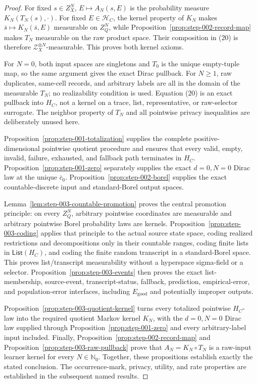 \begin{proof}
For fixed \(s\in Z_X^N\), \(E\mapsto A_N(s,E)\) is the
probability measure \(K_N(T_N(s),\cdot)\). For fixed
\(E\in\mathcal H_C\), the kernel property of \(K_N\) makes
\(\bar s\mapsto K_N(\bar s,E)\) measurable on \(Z_Q^N\), while Proposition~\ref{prop:step-002-record-map} makes \(T_N\) measurable on the
raw product space. Their composition in (20) is therefore
\(\mathcal Z_X^{\otimes N}\)-measurable. This proves both kernel axioms.

For \(N=0\), both input spaces are singletons and \(T_0\) is the unique
empty-tuple map, so the same argument gives the exact Dirac pullback. For
\(N\ge1\), raw duplicates, same-cell records, and arbitrary labels are all
in the domain of the measurable \(T_N\); no realizability condition is used.
Equation (20) is an exact pullback into \(H_C\), not a kernel on a trace,
list, representative, or raw-selector surrogate. The  neighbor
property of \(T_N\) and all pointwise privacy inequalities are deliberately
unused here.

Proposition~\ref{prop:step-001-totalization} supplies the complete
positive-dimensional pointwise quotient procedure and ensures that every
valid, empty, invalid, failure, exhausted, and fallback path terminates in
\(H_C\). Proposition~\ref{prop:step-001-zero} separately supplies
the exact \(d=0,N=0\) Dirac law at the unique \(\bar c_0\). Proposition~\ref{prop:step-002-borel} supplies the exact countable-discrete
input and standard-Borel output spaces.

Lemma~\ref{lem:step-003-countable-promotion} proves the central promotion
principle: on every \(Z_Q^N\), arbitrary pointwise coordinates are
measurable and arbitrary pointwise Borel probability laws are kernels.
Proposition~\ref{prop:step-003-coding} applies that principle to the actual
source state space, coding realized restrictions and decompositions only in
their countable ranges, coding finite lists in
\(\mathsf{List}(H_C)\), and coding the finite random transcript in a
standard-Borel space. This proves list/transcript measurability without a
hyperspace sigma-field or a selector.
Proposition~\ref{prop:step-003-events} then proves the exact list-membership,
source-event, transcript-status, fallback, prediction, empirical-error, and
population-error interfaces, including \(E_{\mathrm{good}}\) and
potentially improper outputs.

Proposition~\ref{prop:step-003-quotient-kernel} turns every totalized
pointwise \(H_C\)-law into the required quotient Markov kernel \(K_N\), with
the \(d=0,N=0\) Dirac law supplied through Proposition~\ref{prop:step-001-zero} and every arbitrary-label input
included. Finally, Proposition~\ref{prop:step-002-record-map} and
Proposition~\ref{prop:step-003-raw-pullback} prove that
\(A_N=K_N\circ T_N\) is a raw-input learner kernel for every
\(N\in\mathbb N_0\). Together, these propositions establish exactly the
stated conclusion.
The occurrence-mark, privacy, utility, and rate properties are established
in the subsequent named results.



\end{proof}

